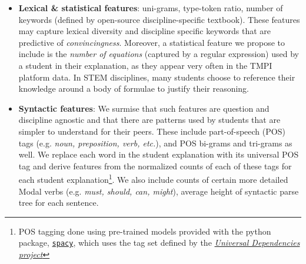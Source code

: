 \documentclass[notitlepage,12pt]{jedm}
\begin{document}
\begin{itemize}
	
	\item \textbf{Lexical \& statistical features}: 
	uni-grams, 
	type-token ratio, 
	number of keywords (defined by open-source discipline-specific 
	textbook).
	These features may capture lexical diversity and discipline 
	specific keywords that are predictive of \textit{convincingness}.  Moreover,
	a statistical feature we propose to include is the \textit{number of 
	equations} (captured by a regular expression) used by a student in their 
	explanation, as they appear very often in the TMPI 
	platform data.
	In STEM disciplines, many students choose to reference their knowledge 
	around a body of formulae to justify their reasoning. 
	
	\item \textbf{Syntactic features}: 
	We surmise that such features are question and discipline agnostic and 
	that there are patterns used by students that are simpler to 
	understand for their peers.
	These include part-of-speech (POS) tags (e.g. \textit{noun, preposition, 
	verb, etc.}), and POS bi-grams and tri-grams as well. 
	We replace each word in the student explanation with its universal POS tag
	and derive features from the normalized counts of each of these tags for 
	each student explanation\footnote{POS tagging done using pre-trained models provided with the 
	python package, \href{spacy.io}{\texttt{spacy}}, which uses the tag set defined by 
	the  \href{https://universaldependencies.org/docs/u/pos/}{\textit{Universal 
	Dependencies project}}}.
	We also include counts of certain more detailed 
	Modal verbs (e.g. \textit{must, should, can, might}),
	average height of syntactic parse tree for each sentence.
	

\end{itemize}
\end{document}
